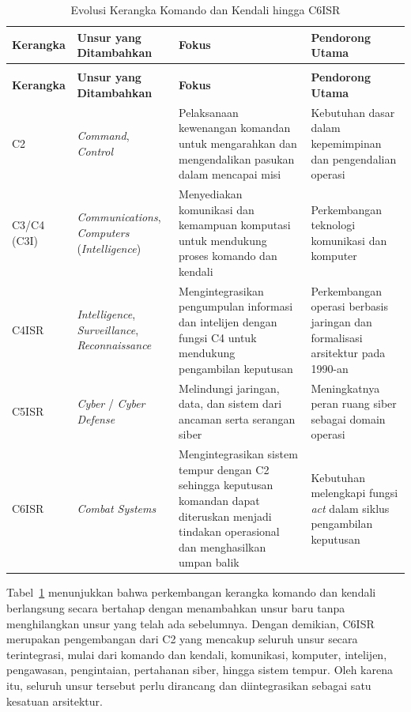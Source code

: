 {\small
\begin{longtable}{@{}>{\raggedright\arraybackslash}p{}>{\raggedright\arraybackslash}p{}>{\raggedright\arraybackslash}p{}>{\raggedright\arraybackslash}p{}@{}}
\caption{Evolusi Kerangka Komando dan Kendali hingga C6ISR}
\label{tab:evolusi-c6isr}\\
\toprule
\textbf{Kerangka} & \textbf{Unsur yang Ditambahkan} & \textbf{Fokus} & \textbf{Pendorong Utama}\\
\midrule
\endfirsthead
\multicolumn{4}{l}{\small\itshape Tabel \thetable{} (lanjutan)}\\
\toprule
\textbf{Kerangka} & \textbf{Unsur yang Ditambahkan} & \textbf{Fokus} & \textbf{Pendorong Utama}\\
\midrule
\endhead
\bottomrule
\endlastfoot
C2 & \textit{Command}, \textit{Control} & Pelaksanaan kewenangan komandan untuk mengarahkan dan mengendalikan pasukan dalam mencapai misi \parencite{Petrovski2023} & Kebutuhan dasar dalam kepemimpinan dan pengendalian operasi\\
\addlinespace
C3/C4 (C3I) & \textit{Communications}, \textit{Computers} (\textit{Intelligence}) & Menyediakan komunikasi dan kemampuan komputasi untuk mendukung proses komando dan kendali \parencite{Todorovic2025} & Perkembangan teknologi komunikasi dan komputer\\
\addlinespace
C4ISR & \textit{Intelligence}, \textit{Surveillance}, \textit{Reconnaissance} & Mengintegrasikan pengumpulan informasi dan intelijen dengan fungsi C4 untuk mendukung pengambilan keputusan \parencite{Petrovski2023} & Perkembangan operasi berbasis jaringan dan formalisasi arsitektur pada 1990-an \parencite{C4ISRAWG1998}\\
\addlinespace
C5ISR & \textit{Cyber} / \textit{Cyber Defense} & Melindungi jaringan, data, dan sistem dari ancaman serta serangan siber \parencite{Petrovski2023} & Meningkatnya peran ruang siber sebagai domain operasi \parencite{NATO2016Warsaw}\\
\addlinespace
C6ISR & \textit{Combat Systems} & Mengintegrasikan sistem tempur dengan C2 sehingga keputusan komandan dapat diteruskan menjadi tindakan operasional dan menghasilkan umpan balik \parencite{Todorovic2025} & Kebutuhan melengkapi fungsi \textit{act} dalam siklus pengambilan keputusan \parencite{USDoD2022}\\
\end{longtable}
}

Tabel~\ref{tab:evolusi-c6isr} menunjukkan bahwa perkembangan kerangka komando dan kendali berlangsung secara bertahap dengan menambahkan unsur baru tanpa menghilangkan unsur yang telah ada sebelumnya.
Dengan demikian, C6ISR merupakan pengembangan dari C2 yang mencakup seluruh unsur secara terintegrasi, mulai dari komando dan kendali, komunikasi, komputer, intelijen, pengawasan, pengintaian, pertahanan siber, hingga sistem tempur.
Oleh karena itu, seluruh unsur tersebut perlu dirancang dan diintegrasikan sebagai satu kesatuan arsitektur.

